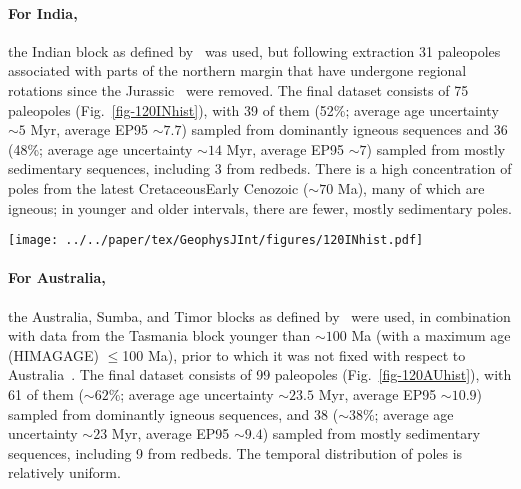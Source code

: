 \paragraph{For India,}
the Indian block as defined by~\citet{Y18} was used, but following extraction 31
paleopoles associated with parts of the northern margin that have undergone
regional rotations since the Jurassic~\citep{G15} were removed. The final
dataset consists of 75 paleopoles (Fig.~\ref{fig-120INhist}), with 39 of them
(52\%; average age uncertainty ${\sim}5$ Myr, average EP95 ${\sim}7.7$\degree)
sampled from dominantly igneous sequences and 36 (48\%; average age uncertainty
${\sim}14$ Myr, average EP95 ${\sim}7$\degree) sampled from mostly sedimentary
sequences, including 3 from redbeds. There is a high concentration of poles from
the latest Cretaceous\textendash{}Early Cenozoic (${\sim}70$ Ma),
many of which are igneous; in younger and older intervals, there are fewer,
mostly sedimentary poles.

\begin{figure*}
\centering
\texttt{[image: ../../paper/tex/GeophysJInt/figures/120INhist.pdf]}
\caption[Distribution of 120 Ma Indian paleopoles]{Temporal
distribution of 120 Ma Indian paleopoles. For red bars, only one
pole, 67 Ma (RESULTNO 8593), is from igneous and also sedimentary.
See Fig.~\ref{fig-120NAhist} for more information.}\label{fig-120INhist}
\end{figure*}

\paragraph{For Australia,}
the Australia, Sumba, and Timor blocks as defined by~\citet{Y18} were used, in
combination with data from the Tasmania block younger than ${\sim}100$ Ma (with
a maximum age (HIMAGAGE) $\leq$100 Ma), prior to which it was not fixed with
respect to Australia~\citep{Y18}. The final dataset consists of 99 paleopoles
(Fig.~\ref{fig-120AUhist}), with 61 of them (${\sim}62$\%; average age
uncertainty ${\sim}23.5$ Myr, average EP95 ${\sim}10.9$\degree) sampled from
dominantly igneous sequences, and 38 (${\sim}38$\%; average age uncertainty
${\sim}23$ Myr, average EP95 ${\sim}9.4$\degree) sampled from mostly sedimentary
sequences, including 9 from redbeds. The temporal distribution of poles is
relatively uniform.

